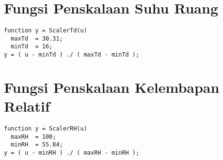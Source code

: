 \section{Fungsi Penskalaan Suhu Ruang}
\begin{lstlisting}
function y = ScalerTd(u)
  maxTd  = 30.31;
  minTd  = 16;
y = ( u - minTd ) ./ ( maxTd - minTd );
\end{lstlisting}
\vspace{1em}

\section{Fungsi Penskalaan Kelembapan Relatif}
\begin{lstlisting}
function y = ScalerRH(u)
  maxRH  = 100;
  minRH  = 55.84;
y = ( u - minRH ) ./ ( maxRH - minRH );
\end{lstlisting}